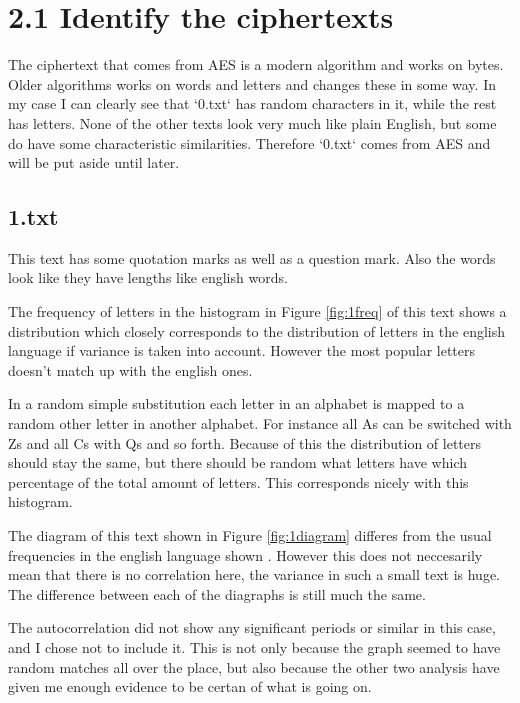\section*{2.1 Identify the ciphertexts}

The ciphertext that comes from AES is a modern algorithm and works on bytes.
Older algorithms works on words and letters and changes these in some way.
In my case I can clearly see that `0.txt` has random characters in it, while the rest has letters.
None of the other texts look very much like plain English, but some do have some characteristic similarities.
Therefore `0.txt` comes from AES and will be put aside until later.

\subsection*{1.txt}

This text has some quotation marks as well as a question mark.
Also the words look like they have lengths like english words.

The frequency of letters in the histogram in Figure \ref{fig:1freq} of this text shows a distribution which closely corresponds to the distribution of letters in the english language\cite{frequencies} if variance is taken into account.
However the most popular letters doesn't match up with the english ones.

In a random simple substitution each letter in an alphabet is mapped to a random other letter in another alphabet.
For instance all As can be switched with Zs and all Cs with Qs and so forth.
Because of this the distribution of letters should stay the same, but there should be random what letters have which percentage of the total amount of letters.
This corresponds nicely with this histogram.

The diagram of this text shown in Figure \ref{fig:1diagram} differes from the usual frequencies in the english language shown \cite{diagraphs}.
However this does not neccesarily mean that there is no correlation here, the variance in such a small text is huge.
The difference between each of the diagraphs is still much the same.

The autocorrelation did not show any significant periods or similar in this case, and I chose not to include it.
This is not only because the graph seemed to have random matches all over the place, but also because the other two analysis have given me enough evidence to be certan of what is going on.

